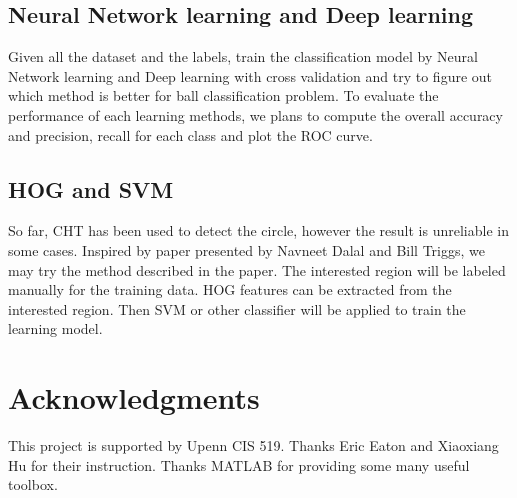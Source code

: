 \documentclass{article}
\begin{document}
\subsection{Neural Network learning and Deep learning}
Given all the dataset and the labels, train the classification model by Neural Network learning and Deep learning with cross validation and try to figure out which method is better for ball classification problem. To evaluate the performance of each learning methods, we plans to compute the overall accuracy and precision, recall for each class and plot the ROC curve.

\subsection{HOG and SVM}
So far, CHT has been used to detect the circle, however the result is unreliable in some cases. Inspired by paper presented\cite{dalal2005histograms} by Navneet Dalal and Bill Triggs, we may try the method described in the paper. The interested region will be labeled manually for the training data. HOG features can be extracted from the interested region. Then SVM or other classifier will be applied to train the learning model. 

\section*{Acknowledgments} 
This project is supported by Upenn CIS 519. Thanks Eric Eaton and Xiaoxiang Hu for their instruction. Thanks MATLAB for providing some many useful toolbox.



\end{document}
